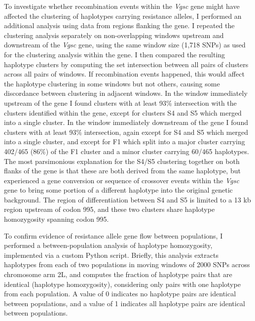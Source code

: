 \begin{refsection}
To investigate whether recombination events within the \textit{Vgsc} gene might have affected the clustering of haplotypes carrying resistance alleles, I performed an additional analysis using data from regions flanking the gene.
%
I repeated the clustering analysis separately on non-overlapping windows upstream and downstream of the \textit{Vgsc} gene, using the same window size (1,718 SNPs) as used for the clustering analysis within the gene.
%
I then compared the resulting haplotype clusters by computing the set intersection between all pairs of clusters across all pairs of windows.
%
If recombination events happened, this would affect the haplotype clustering in some windows but not others, causing some discordance between clustering in adjacent windows.
%
In the window immediately upstream of the gene I found clusters with at least 93\% intersection with the clusters identified within the gene, except for clusters S4 and S5 which merged into a single cluster.
%
In the window immediately downstream of the gene I found clusters with at least 93\% intersection, again except for S4 and S5 which merged into a single cluster, and except for F1 which split into a major cluster carrying 402/465 (86\%) of the F1 cluster and a minor cluster carrying 60/465 haplotypes.
%
The most parsimonious explanation for the S4/S5 clustering together on both flanks of the gene is that these are both derived from the same haplotype, but experienced a gene conversion or sequence of crossover events within the \textit{Vgsc} gene to bring some portion of a different haplotype into the original genetic background.
%
The region of differentiation between S4 and S5 is limited to a 13 kb region upstream of codon 995, and these two clusters share haplotype homozygosity spanning codon 995.


To confirm evidence of resistance allele gene flow between populations, I performed a between-population analysis of haplotype homozygosity, implemented via a custom Python script.
%
Briefly, this analysis extracts haplotypes from each of two populations in moving windows of 2000 SNPs across chromosome arm 2L, and computes the fraction of haplotype pairs that are identical (haplotype homozygosity), considering only pairs with one haplotype from each population.
%
A value of 0 indicates no haplotype pairs are identical between populations, and a value of 1 indicates all haplotype pairs are identical between populations.



\end{refsection}

